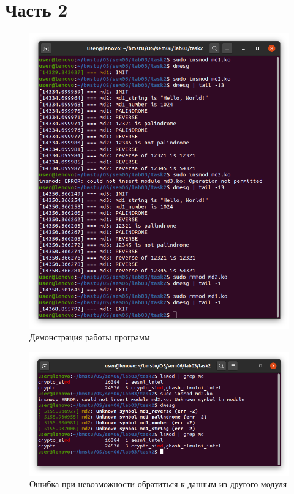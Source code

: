 \documentclass[a4paper,oneside,12pt]{extreport}
\begin{document}
\section*{Часть 2}





\begin{figure}[H]
	\centering
	\includegraphics[width=\linewidth]{inc/img/task2-1}
	\caption{Демонстрация работы программ}
	\label{img:task2-1}
\end{figure}

\begin{figure}[H]
	\centering
	\includegraphics[width=\linewidth]{inc/img/task2-2}
	\caption{Ошибка при невозможности обратиться к данным из другого модуля}
	\label{img:task2-2}
\end{figure}
\end{document}
